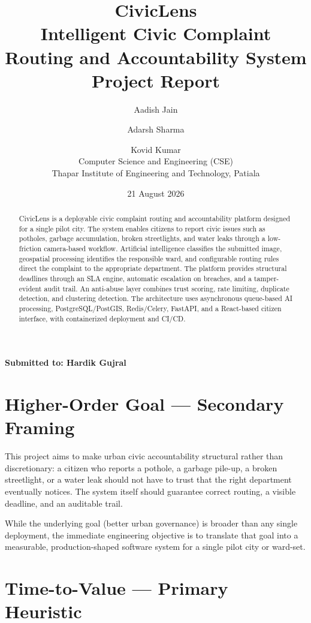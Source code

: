 \documentclass[12pt,a4paper]{article}
\title{
    \textbf{CivicLens}\\[0.35em]
    \large Intelligent Civic Complaint Routing and Accountability System\\[0.5em]
    \normalsize Project Report
}
\author{
    Aadish Jain \and Adarsh Sharma \and Kovid Kumar\\
    \small Computer Science and Engineering (CSE)\\
    \small Thapar Institute of Engineering and Technology, Patiala
}
\date{21 August 2026}
\begin{document}
\maketitle
\thispagestyle{empty}

\vspace{1em}
\begin{center}
\textbf{Submitted to: Hardik Gujral}
\end{center}

\vfill

\begin{abstract}
CivicLens is a deployable civic complaint routing and accountability platform designed for a single pilot city. The system enables citizens to report civic issues such as potholes, garbage accumulation, broken streetlights, and water leaks through a low-friction camera-based workflow. Artificial intelligence classifies the submitted image, geospatial processing identifies the responsible ward, and configurable routing rules direct the complaint to the appropriate department. The platform provides structural deadlines through an SLA engine, automatic escalation on breaches, and a tamper-evident audit trail. An anti-abuse layer combines trust scoring, rate limiting, duplicate detection, and clustering detection. The architecture uses asynchronous queue-based AI processing, PostgreSQL/PostGIS, Redis/Celery, FastAPI, and a React-based citizen interface, with containerized deployment and CI/CD.
\end{abstract}

\newpage
\tableofcontents
\newpage

\section{Higher-Order Goal --- Secondary Framing}

This project aims to make urban civic accountability structural rather than discretionary: a citizen who reports a pothole, a garbage pile-up, a broken streetlight, or a water leak should not have to trust that the right department eventually notices. The system itself should guarantee correct routing, a visible deadline, and an auditable trail.

While the underlying goal (better urban governance) is broader than any single deployment, the immediate engineering objective is to translate that goal into a measurable, production-shaped software system for a single pilot city or ward-set.

\section{Time-to-Value --- Primary Heuristic}
\end{document}
